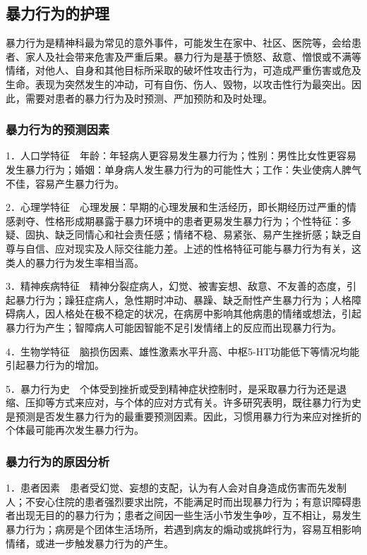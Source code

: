 \subsection{暴力行为的护理}

暴力行为是精神科最为常见的意外事件，可能发生在家中、社区、医院等，会给患者、家人及社会带来危害及严重后果。暴力行为是基于愤怒、敌意、憎恨或不满等情绪，对他人、自身和其他目标所采取的破坏性攻击行为，可造成严重伤害或危及生命。表现为突然发生的冲动，可有自伤、伤人、毁物，以攻击性行为最突出。因此，需要对患者的暴力行为及时预测、严加预防和及时处理。

\subsubsection{暴力行为的预测因素}

1．人口学特征　年龄：年轻病人更容易发生暴力行为；性别：男性比女性更容易发生暴力行为；婚姻：单身病人发生暴力行为的可能性大；工作：失业使病人脾气不佳，容易产生暴力行为。

2．心理学特征　心理发展：早期的心理发展和生活经历，即长期经历过严重的情感剥夺、性格形成期暴露于暴力环境中的患者更易发生暴力行为；个性特征：多疑、固执、缺乏同情心和社会责任感；情绪不稳、易紧张、易产生挫折感；缺乏自尊与自信、应对现实及人际交往能力差。上述的性格特征可能与暴力行为有关，这类人的暴力行为发生率相当高。

3．精神疾病特征　精神分裂症病人，幻觉、被害妄想、敌意、不友善的态度，引起暴力行为；躁狂症病人，急性期时冲动、暴躁、缺乏耐性产生暴力行为；人格障碍病人，因人格处在极不稳定的状况，在病房中影响其他病患的情绪或想法，引起暴力行为产生；智障病人可能因智能不足引发情绪上的反应而出现暴力行为。

4．生物学特征　脑损伤因素、雄性激素水平升高、中枢5-HT功能低下等情况均能引起暴力行为的增加。

5．暴力行为史　个体受到挫折或受到精神症状控制时，是采取暴力行为还是退缩、压抑等方式来应对，与个体的应对方式有关。许多研究表明，既往暴力行为史是预测是否发生暴力行为的最重要预测因素。因此，习惯用暴力行为来应对挫折的个体最可能再次发生暴力行为。

\subsubsection{暴力行为的原因分析}

1．患者因素　患者受幻觉、妄想的支配，认为有人会对自身造成伤害而先发制人；不安心住院的患者强烈要求出院，不能满足时而出现暴力行为；有意识障碍患者出现无目的的暴力行为；患者之间因一些生活小节发生争吵，互不相让，易发生暴力行为；病房是个团体生活场所，若遇到病友的煽动或挑衅行为，容易互相影响情绪，或进一步触发暴力行为的产生。

